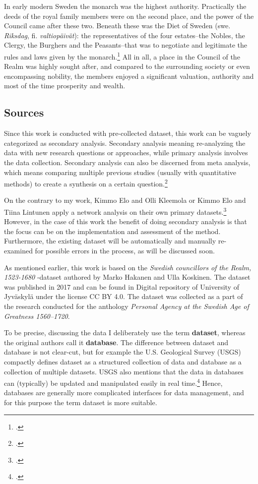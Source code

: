 In early modern Sweden the monarch was the highest authority. Practically the deeds of the royal family members were on the second place, and the power of the Council came after these two. Beneath these was the Diet of Sweden (swe. \textit{Riksdag}, fi. \textit{valtiopäivät}): the representatives of the four estates–the Nobles, the Clergy, the Burghers and the Peasants–that was to negotiate and legitimate the rules and laws given by the monarch.\footcite[pp. 57-61.]{pSuurvalta}  All in all, a place in the Council of the Realm was highly sought after, and compared to the surrounding society or even encompassing nobility, the members enjoyed a significant valuation, authority and most of the time prosperity and wealth.

\subsection{Sources}
\label{sources}
Since this work is conducted with pre-collected dataset, this work can be vaguely categorized as secondary analysis. Secondary analysis meaning re-analyzing the data with new research questions or approaches, while primary analysis involves the data collection. Secondary analysis can also be discerned from meta analysis, which means comparing multiple previous studies (usually with quantitative methods) to create a synthesis on a certain question.\footcite[pp. 4-5.]{meta-analysis} 

On the contrary to my work, Kimmo Elo and Olli Kleemola or Kimmo Elo and Tiina Lintunen apply a network analysis on their own primary datasets.\footcites{eloAklee15}{LintunenAndElo2019} However, in the case of this work the benefit of doing secondary analysis is that the focus can be on the implementation and assessment of the method. Furthermore, the existing dataset will be automatically and manually re-examined for possible errors in the process, as will be discussed soon.

As mentioned earlier, this work is based on the \textit{Swedish councillors of the Realm, 1523-1680} -dataset authored by Marko Hakanen and Ulla Koskinen. The dataset was published in 2017 and can be found in Digital repository of University of Jyväskylä under the license CC BY 4.0. The dataset was collected as a part of the research conducted for the anthology \textit{Personal Agency at the Swedish Age of Greatness 1560–1720}.

To be precise, discussing the data I deliberately use the term \textbf{dataset}, whereas the original authors call it \textbf{database}. The difference between dataset and database is not clear-cut, but for example the U.S. Geological Survey (USGS) compactly defines dataset as a structured collection of data and database as a collection of multiple datasets. USGS also mentions that the data in databases can (typically) be updated and manipulated easily in real time.\footcite{usgs} Hence, databases are generally more complicated interfaces for data management, and for this purpose the term dataset is more suitable.

